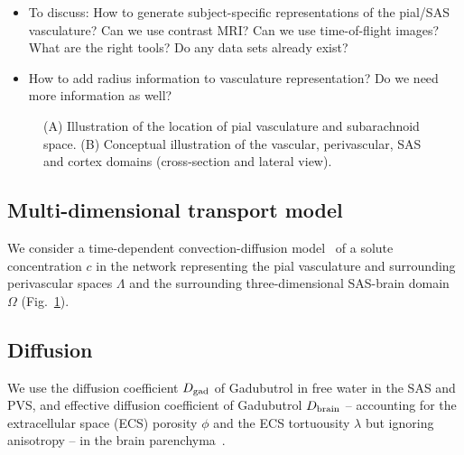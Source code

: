 \documentclass[fleqn,10pt]{wlscirep}
\begin{document}
\begin{itemize}
    \item To discuss: How to generate subject-specific representations of the pial/SAS vasculature? Can we use contrast MRI? Can we use time-of-flight images? What are the right tools? Do any data sets already exist? 
    \item How to add radius information to vasculature representation? Do we need more information as well?
\end{itemize}


\begin{figure}
\caption{(A) Illustration of the location of pial vasculature and subarachnoid space. (B) Conceptual illustration of the vascular, perivascular, SAS and cortex domains (cross-section and lateral view).}
\label{fig:concept}
\end{figure}

\subsection*{Multi-dimensional transport model}

We consider a time-dependent convection-diffusion model~\cite{masri2023modelling} of a solute concentration $c$ in the network representing the pial vasculature and surrounding perivascular spaces $\Lambda$ and the surrounding three-dimensional SAS-brain domain $\Omega$ (Fig.~\ref{fig:concept}). 

\subsection*{Diffusion}
We use the diffusion coefficient $D_{\rm gad}$ of Gadubutrol in free water in the SAS and PVS, and effective diffusion coefficient of Gadubutrol $D_{\rm brain}$ -- accounting for the extracellular space (ECS) porosity $\phi$ and the ECS tortuousity $\lambda$ but ignoring anisotropy  -- in the brain parenchyma~\cite{hornkjol2022csf}. 
\end{document}
